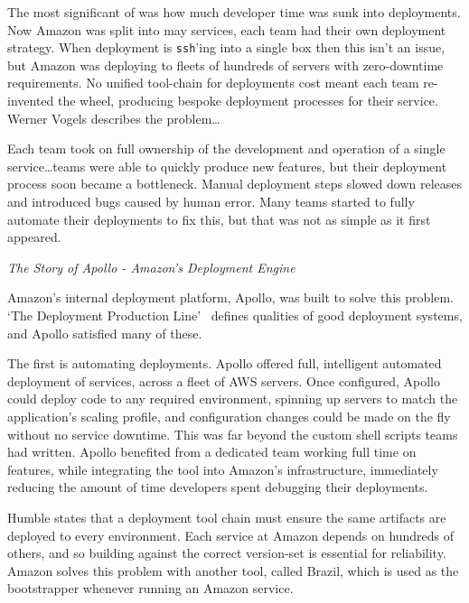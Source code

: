 \documentclass[11pt]{article}
\begin{document}
The most significant of was how much developer time was sunk into deployments.
Now Amazon was split into may services, each team had their own deployment
strategy. When deployment is \texttt{ssh}'ing into a single box then this isn't
an issue, but Amazon was deploying to fleets of hundreds of servers with
zero-downtime requirements. No unified tool-chain for deployments cost meant
each team re-invented the wheel, producing bespoke deployment processes for
their service. Werner Vogels describes the problem\dots

\begin{displayquote}

  Each team took on full ownership of the development and operation of a single
  service\dots teams were able to quickly produce new features, but their deployment
  process soon became a bottleneck. Manual deployment steps slowed down releases
  and introduced bugs caused by human error. Many teams started to fully
  automate their deployments to fix this, but that was not as simple as it first
  appeared.

  \textit{The Story of Apollo - Amazon's Deployment Engine~\cite{theStoryOfApollo}}

\end{displayquote}

Amazon's internal deployment platform, Apollo, was built to solve this problem.
`The Deployment Production Line'~\cite{deploymentProductionLine} defines
qualities of good deployment systems, and Apollo satisfied many of these.

The first is automating deployments. Apollo offered full, intelligent automated
deployment of services, across a fleet of AWS servers. Once configured, Apollo
could deploy code to any required environment, spinning up servers to match the
application's scaling profile, and configuration changes could be made on the
fly without no service downtime. This was far beyond the custom shell scripts
teams had written. Apollo benefited from a dedicated team working full time on
features, while integrating the tool into Amazon's infrastructure, immediately
reducing the amount of time developers spent debugging their deployments.

Humble states that a deployment tool chain must ensure the same artifacts are
deployed to every environment. Each service at Amazon depends on hundreds of
others, and so building against the correct version-set is essential for
reliability. Amazon solves this problem with another tool, called Brazil, which
is used as the bootstrapper whenever running an Amazon service.
\end{document}
